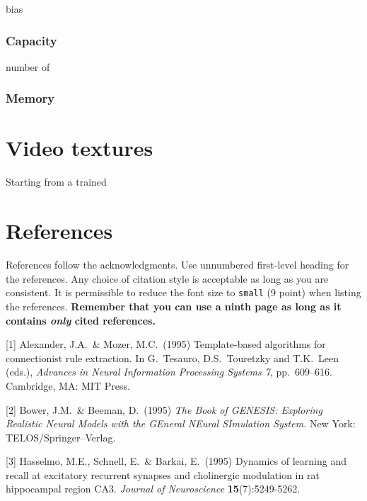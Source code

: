 \documentclass{article}
\begin{document}
bias

\subsubsection{Capacity}

number of 

\subsubsection{Memory}

\section{Video textures}

Starting from a trained

\section*{References}

References follow the acknowledgments. Use unnumbered first-level
heading for the references. Any choice of citation style is acceptable
as long as you are consistent. It is permissible to reduce the font
size to \verb+small+ (9 point) when listing the references. {\bf
  Remember that you can use a ninth page as long as it contains
  \emph{only} cited references.}
\medskip

\small

[1] Alexander, J.A.\ \& Mozer, M.C.\ (1995) Template-based algorithms
for connectionist rule extraction. In G.\ Tesauro, D.S.\ Touretzky and
T.K.\ Leen (eds.), {\it Advances in Neural Information Processing
  Systems 7}, pp.\ 609--616. Cambridge, MA: MIT Press.

[2] Bower, J.M.\ \& Beeman, D.\ (1995) {\it The Book of GENESIS:
  Exploring Realistic Neural Models with the GEneral NEural SImulation
  System.}  New York: TELOS/Springer--Verlag.

[3] Hasselmo, M.E., Schnell, E.\ \& Barkai, E.\ (1995) Dynamics of
learning and recall at excitatory recurrent synapses and cholinergic
modulation in rat hippocampal region CA3. {\it Journal of
  Neuroscience} {\bf 15}(7):5249-5262.
\end{document}
